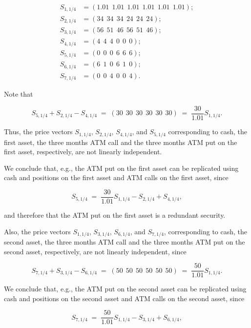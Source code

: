 \begin{align*}
S_{1,1/4} &= (1.01\ \ 1.01\ \ 1.01\ \ 1.01\ \ 1.01\ \ 1.01); \\
S_{2,1/4} &= (34\ \ 34\ \ 34\ \ 24\ \ 24\ \ 24); \\
S_{3,1/4} &= (56\ \ 51\ \ 46\ \ 56\ \ 51\ \ 46); \\
S_{4,1/4} &= (4\ \ 4\ \ 4\ \ 0\ \ 0\ \ 0); \\
S_{5,1/4} &= (0\ \ 0\ \ 0\ \ 6\ \ 6\ \ 6); \\
S_{6,1/4} &= (6\ \ 1\ \ 0\ \ 6\ \ 1\ \ 0); \\
S_{7,1/4} &= (0\ \ 0\ \ 4\ \ 0\ \ 0\ \ 4).
\end{align*}

Note that

\begin{equation}
S_{5,1/4}+S_{2,1/4}-S_{4,1/4} \;=\; (30\ \ 30\ \ 30\ \ 30\ \ 30\ \ 30)
\;=\; \frac{30}{1.01}S_{1,1/4}.
\end{equation}

Thus, the price vectors $S_{1,1/4}$, $S_{2,1/4}$, $S_{4,1/4}$, and
$S_{5,1/4}$ corresponding to cash, the first asset, the three months ATM
call and the three months ATM put on the first asset, respectively, are
not linearly independent.

We conclude that, e.g., the ATM put on the first asset can be replicated
using cash and positions on the first asset and ATM calls on the first
asset, since

\[
S_{5,1/4} \;=\; \frac{30}{1.01}S_{1,1/4} - S_{2,1/4} + S_{4,1/4},
\]

and therefore that the ATM put on the first asset is a redundant security.

Also, the price vectors $S_{1,1/4}$, $S_{3,1/4}$, $S_{6,1/4}$, and
$S_{7,1/4}$, corresponding to cash, the second asset, the three months ATM
call and the three months ATM put on the second asset, respectively, are
not linearly independent, since

\begin{equation}
S_{7,1/4}+S_{3,1/4}-S_{6,1/4} \;=\; (50\ \ 50\ \ 50\ \ 50\ \ 50\ \ 50)
\;=\; \frac{50}{1.01}S_{1,1/4}.
\end{equation}

We conclude that, e.g., the ATM put on the second asset can be replicated
using cash and positions on the second asset and ATM calls on the second
asset, since

\[
S_{7,1/4} \;=\; \frac{50}{1.01}S_{1,1/4} - S_{3,1/4} + S_{6,1/4},
\]

